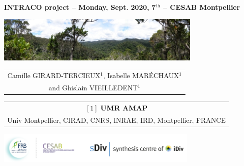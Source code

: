 {

  \begin{frame}
    \begin{center}
        \small{\textbf{INTRACO project -- Monday, Sept. 2020, 7$^{\text{th}}$ -- CESAB Montpellier}}
    \end{center}
    \vspace{-0.25cm}
    \titlepage %
    \vspace{-2.5cm}
    \begin{center}
      \includegraphics[width=10cm]{figs/Banniere.png}
    \end{center}
    \vspace{0.25cm}
    \begin{center}

        \begin{tabular}{c}
          Camille \uppercase{Girard-Tercieux}$^{1}$, Isabelle \uppercase{Maréchaux}$^{1}$ \\ and Ghislain \uppercase{Vieilledent}$^{1}$
        \end{tabular}

      \vspace{0.25cm}

      {\small
        \begin{tabular}{c}
          $[1]$ \textbf{UMR AMAP} \\ Univ Montpellier, CIRAD, CNRS, INRAE, IRD, Montpellier, FRANCE
        \end{tabular}
      }

      \vspace{0.25cm}

      \includegraphics[height=1.5cm]{figs/logos-FRB-Cesab-iDiv-sDiv}

    \end{center}
    
  \end{frame}
}
\setcounter{framenumber}{0}

